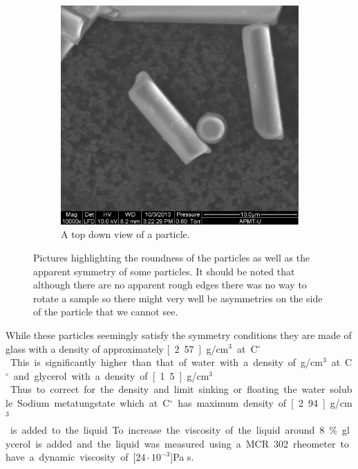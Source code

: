 \begin{figure}[H]
\begin{subfigure}[3b]{0.40\textwidth}
\includegraphics[width=\textwidth]{figures/method/round.png}
\caption{A top down view of a particle.}\label{fig:roundparticle}
\end{subfigure}
\caption{Pictures highlighting the roundness of the particles as well as the apparent symmetry of some particles. It should be noted that although there are no apparent rough edges there was no way to rotate a sample so there might very well be asymmetries on the side of the particle that we cannot see.}
\label{fig:particlepictures2}
\end{figure}

While these particles seemingly satisfy the symmetry conditions they are made of glass with a density of approximately 
\unit[2.57]{g/cm$^3$} at \unit[20]{C$^\circ$}. This is significantly higher than that of water with a density of 
\unit[1]{g/cm$^3$} at \unit[20]{C$^\circ$} and glycerol with a density of \unit[1.5]{g/cm$^3$}. Thus to correct for the 
density and limit sinking or floating the water soluble Sodium metatungstate which at \unit[20]{C$^\circ$} has maximum 
density of \unit[2.94]{g/cm$^3$} is added to the liquid. To increase the viscosity of the liquid around 8\% glycerol is added and the liquid 
was measured using a MCR 302 rheometer to have a dynamic viscosity of \unit[$24\cdot 10^{-3}$]{Pa s}.
